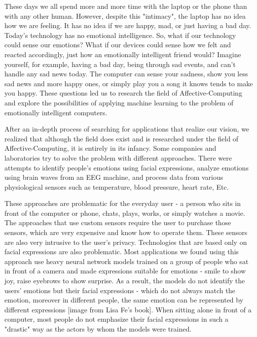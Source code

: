 \documentclass[../main.tex]{subfiles}
\begin{document}
These days we all spend more and more time with the laptop or the phone than with any other human. However, despite this "intimacy", 
the laptop has no idea how we are feeling. It has no idea if we are happy, mad, or just having a bad day. Today's technology has no emotional intelligence. 
So, what if our technology could sense our emotions? What if our devices could sense how we felt and reacted accordingly, just how an emotionally intelligent friend would?  Imagine yourself, for example, having a bad day, being through sad events, and can't handle any sad news today. 
The computer can sense your sadness, show you less sad news and more happy ones, or simply play you a song it knows tends to make you happy.
These questions led us to research the field of Affective-Computing and explore the possibilities of applying machine learning to the problem of emotionally intelligent computers.

After an in-depth process of searching for applications that realize our vision, 
we realized that although the field does exist and is researched under the field of Affective-Computing, 
it is entirely in its infancy. Some companies and laboratories try to solve the problem with different approaches. 
There were attempts to identify people's emotions using facial expressions, analyze emotions using brain waves from an EEG machine, 
and process data from various physiological sensors such as temperature, blood pressure, heart rate, Etc.

These approaches are problematic for the everyday user - a person who sits in front of the computer or phone, chats, 
plays, works, or simply watches a movie. The approaches that use custom sensors require the user to purchase those sensors, 
which are very expensive and know how to operate them. These sensors are also very intrusive to the user's privacy. 
Technologies that are based only on facial expressions are also problematic. Most applications we found using this approach use heavy neural network
models trained on a group of people who sat in front of a camera and made expressions suitable for emotions - smile to show joy, raise eyebrows to show surprise.
As a result, the models do not identify the users' emotions but their facial expressions - which do not always match the emotion, moreover in different people, 
the same emotion can be represented by different expressions [image from Lisa Fe's book]. 
When sitting alone in front of a computer, most people do not emphasize their facial expressions in such a "drastic" way as the actors by whom the 
models were trained.
\end{document}
